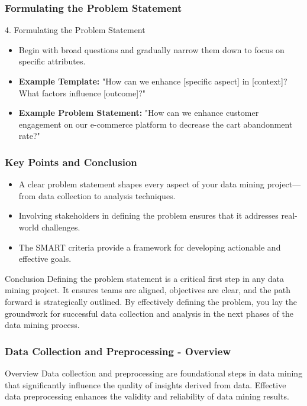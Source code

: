 \documentclass[aspectratio=169]{beamer}
\begin{document}
\begin{frame}[fragile]
    \frametitle{Formulating the Problem Statement}
    \begin{block}{4. Formulating the Problem Statement}
        \begin{itemize}
            \item Begin with broad questions and gradually narrow them down to focus on specific attributes.
            \item \textbf{Example Template:} "How can we enhance [specific aspect] in [context]? What factors influence [outcome]?"
            \item \textbf{Example Problem Statement:} "How can we enhance customer engagement on our e-commerce platform to decrease the cart abandonment rate?"
        \end{itemize}
    \end{block}
\end{frame}

\begin{frame}[fragile]
    \frametitle{Key Points and Conclusion}
    \begin{itemize}
        \item A clear problem statement shapes every aspect of your data mining project—from data collection to analysis techniques.
        \item Involving stakeholders in defining the problem ensures that it addresses real-world challenges.
        \item The SMART criteria provide a framework for developing actionable and effective goals.
    \end{itemize}
    
    \begin{block}{Conclusion}
        Defining the problem statement is a critical first step in any data mining project.  
        It ensures teams are aligned, objectives are clear, and the path forward is strategically outlined.  
        By effectively defining the problem, you lay the groundwork for successful data collection and analysis in the next phases of the data mining process.
    \end{block}
\end{frame}

\begin{frame}[fragile]
    \frametitle{Data Collection and Preprocessing - Overview}
    \begin{block}{Overview}
        Data collection and preprocessing are foundational steps in data mining that significantly influence the quality of insights derived from data. 
        Effective data preprocessing enhances the validity and reliability of data mining results.
    \end{block}
\end{frame}
\end{document}
